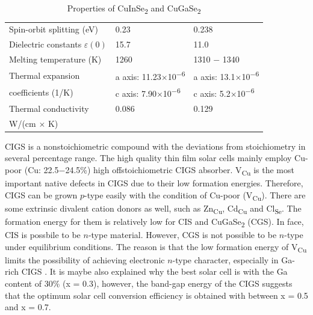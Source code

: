 \documentclass[a4paper, 12pt, titlepage,oneside,drop]{kthesis}
\begin{document}
\begin {table}[!htb]
\begin{tabular}{l l l}
\rowcolor[gray]{0.9}
Spin-orbit splitting (eV) & 0.23 \cite{madelung2004semiconductors}& 0.238 \cite{madelung2004semiconductors} \\ 
Dielectric constants $\varepsilon(0)$ & 15.7 \cite{madelung2004semiconductors} & 11.0 \cite{rau2006wide}\\
\rowcolor[gray]{0.9}
Melting temperature (K)& 1260 \cite{madelung2004semiconductors} & 1310 $-$ 1340 \cite{madelung2004semiconductors}\\
Thermal expansion & a axis: 11.23$\times$10\textsuperscript{$-$6} \cite{madelung2004semiconductors}& a axis: 13.1$\times$10\textsuperscript{$-$6} \cite{madelung2004semiconductors}\\
 coefficients (1/K) & c axis: 7.90$\times$10\textsuperscript{$-$6} \cite{madelung2004semiconductors}&c axis: 5.2$\times$10\textsuperscript{$-$6} \cite{madelung2004semiconductors}\\ 
\rowcolor[gray]{0.9}
Thermal conductivity& 0.086 \cite{neumann1986optical} & 0.129 \cite{madelung2004semiconductors} \\ 
 \rowcolor[gray]{0.9} W/(cm $\times$ K)&  & \\ 
\bottomrule
\end{tabular}
\caption {Properties of CuInSe\textsubscript{2} and CuGaSe\textsubscript{2}}
\label{kth518}
\end{table}



CIGS is a nonstoichiometric compound with the deviations from stoichiometry in several percentage range. The high quality thin film solar cells mainly employ Cu-poor (Cu: 22.5$-$24.5\%) high offstoichiometric CIGS absorber.
V\textsubscript{Cu} is the most important native defects in CIGS due to their low formation energies. Therefore, CIGS can be grown $p$-type easily with the condition of Cu-poor (V\textsubscript{Cu}).
There are some extrinsic divalent cation donors as well, such as Zn\textsubscript{Cu}, Cd\textsubscript{Cu} and Cl\textsubscript{Se}. The formation energy 
for them is relatively low for CIS and CuGaSe\textsubscript{2} (CGS). In face, CIS is possbile to be $n$-type material. However, CGS is not possible to be $n$-type under equilibrium conditions. The reason is that the low formation energy of
V\textsubscript{Cu} limits the possibility of achieving electronic $n$-type character, especially in Ga-rich CIGS \cite{persson2005n, zhao2004can}. It is maybe also explained why the best solar cell is with the Ga content of 30\% (x = 0.3), however,
the band-gap energy of the CIGS suggests that the optimum solar cell conversion efficiency is obtained with between x = 0.5 and x = 0.7.
\end{document}
